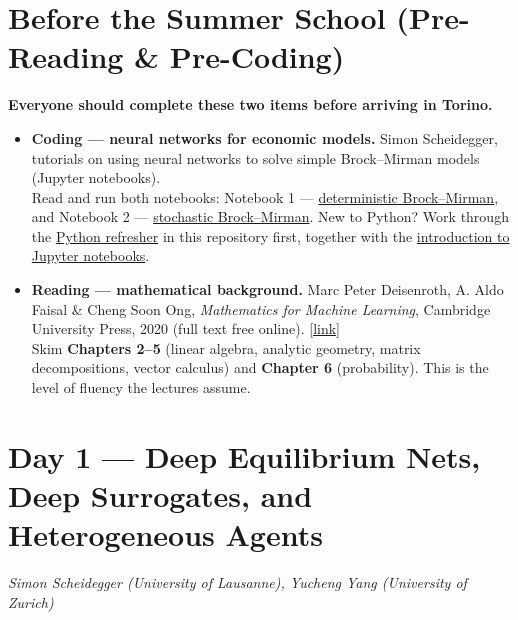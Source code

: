 \documentclass[11pt]{article}
\begin{document}
\section*{Before the Summer School (Pre-Reading \& Pre-Coding)}

{\color{alertred}\textbf{Everyone should complete these two items before arriving in Torino.}}

\begin{itemize}
  \item \textbf{Coding --- neural networks for economic models.}
  Simon Scheidegger, tutorials on using neural networks to solve simple Brock--Mirman models (Jupyter notebooks).\\[1.5pt]
  {\small\color{notegray}Read and run both notebooks:
  Notebook 1 ---
  \href{https://github.com/sischei/Deep_Learning_for_Solving_And_Estimating_Dynamic_Economic_Models/blob/main/lectures/lecture_03_deep_equilibrium_nets/code/lecture_03_01_Brock_Mirman_1972_DEQN.ipynb}{deterministic Brock--Mirman},
  and Notebook 2 ---
  \href{https://github.com/sischei/Deep_Learning_for_Solving_And_Estimating_Dynamic_Economic_Models/blob/main/lectures/lecture_03_deep_equilibrium_nets/code/lecture_03_02_Brock_Mirman_Uncertainty_DEQN.ipynb}{stochastic Brock--Mirman}. New to Python? Work through the
  \href{https://github.com/sischei/summer-school-AI-for-economics-and-finance-2026/tree/main/python_refresher}{Python refresher} in this repository first, together with the
  \href{https://github.com/sischei/summer-school-AI-for-economics-and-finance-2026/blob/main/python_refresher/jupyter_intro.ipynb}{introduction to Jupyter notebooks}.}

  \item \textbf{Reading --- mathematical background.}
  Marc Peter Deisenroth, A. Aldo Faisal \& Cheng Soon Ong, \textit{Mathematics for Machine Learning}, Cambridge University Press, 2020 (full text free online).
  \href{https://mml-book.github.io/}{[link]}\\[1.5pt]
  {\small\color{notegray}Skim \textbf{Chapters 2--5} (linear algebra, analytic geometry, matrix decompositions, vector calculus) and \textbf{Chapter 6} (probability). This is the level of fluency the lectures assume.}
\end{itemize}

\label{day1}
\section*{Day 1 --- Deep Equilibrium Nets, Deep Surrogates, and Heterogeneous Agents}
\textit{Simon Scheidegger (University of Lausanne), Yucheng Yang (University of Zurich)}
\smallskip
\end{document}

